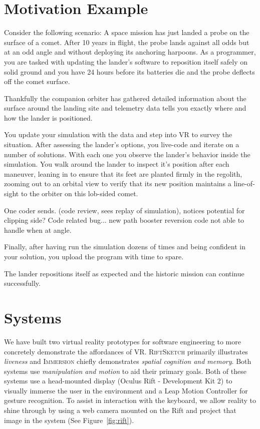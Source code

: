 \documentclass[conference]{IEEEtran}
\begin{document}
\section{Motivation Example}

Consider the following scenario: A space mission has just landed a probe on the surface of a comet.
After 10 years in flight, the probe lands against all odds but at an odd angle and without deploying its anchoring harpoons. 
As a programmer, you are tasked with updating the lander's software to reposition itself safely on solid ground and you have 24 hours before its batteries die and the probe deflects off the comet surface.

Thankfully the companion orbiter has gathered detailed information about the surface around the landing site and telemetry data tells you exactly where and how the lander is positioned. 

You update your simulation with the data and step into VR to survey the situation. 
After assessing the lander's options, you live-code and iterate on a number of solutions. 
With each one you observe the lander's behavior inside the simulation. 
You walk around the lander to inspect it's position after each maneuver, leaning in to ensure that its feet are planted firmly in the regolith, zooming out to an orbital view to verify that its new position maintains a line-of-sight to the orbiter on this lob-sided comet. 

One coder sends. (code review, sees replay of simulation), notices potential for clipping side?  Code related bug... new path booster reversion code not able to handle when at angle.

Finally, after having run the simulation dozens of times and being confident in your solution, you upload the program with time to spare. 


The lander repositions itself as expected and the historic mission can continue successfully.
  

\section{Systems}

We have built two virtual reality prototypes for software engineering to more concretely demonstrate the affordances of VR. 
\textsc{RiftSketch} primarily illustrates \emph{liveness} and \textsc{Immersion} chiefly demonstrates \emph{spatial cognition and memory}.
Both systems use \emph{manipulation and motion} to aid their primary goals.
Both of these systems use a head-mounted display (Oculus Rift - Development Kit 2) to visually immerse the user in the environment and a Leap Motion Controller for gesture recognition.
To assist in interaction with the keyboard, we allow reality to shine through by using a web camera mounted on the Rift and project that image in the system (See Figure~\ref{fig:rift}).
\end{document}
